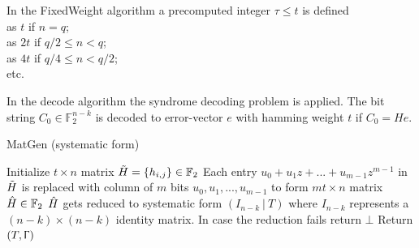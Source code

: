 \documentclass[11pt,
  oneside,openany,    %
]{scrreprt}
\begin{document}
In the FixedWeight algorithm a precomputed integer $\tau \leq t$ is defined \\
as $t$ if $n = q$;\\
as $2t$ if $q/2 \leq n < q$;\\
as $4t$ if $q/4 \leq n < q/2$;\\
etc.

In the decode algorithm the syndrome decoding problem is applied. The bit string $C_{0} \in \mathbb{F}^{n-k}_{2}$ is decoded to error-vector $e$ with hamming weight $t$ if $C_{0} = He$.

\begin{algorithm}[H]
\caption{MatGen (systematic form)}\label{alg:MatGen}

Initialize $t \times n$ matrix $\Tilde{H} = \{h_{i,j}\} \in \mathbb{F}_{2}$\;
Each entry $u_{0} + u_{1}z + ...+ u_{m-1}z^{m-1}$ in $\Tilde{H}$ is replaced with column of $m$ bits $u_{0},u_{1},...,u_{m-1}$ to form $mt \times n$ matrix $\Hat{H} \in  \mathbb{F}_{2}$\;
$\Hat{H}$ gets reduced to systematic form $(I_{n-k} \ | \ T)$ where $I_{n-k}$ represents a $(n-k) \times (n-k)$ identity matrix. In case the reduction fails return $\bot$\;
Return $(T, \Upgamma)$\;
\end{algorithm}
\end{document}
